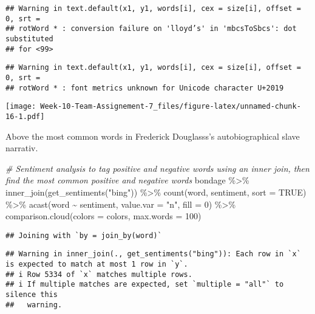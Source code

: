 \documentclass[
]{article}
\newenvironment{Shaded}{\begin{snugshade}}{\end{snugshade}}
\newcommand{\AttributeTok}[1]{\textcolor[rgb]{0.77,0.63,0.00}{#1}}
\newcommand{\CommentTok}[1]{\textcolor[rgb]{0.56,0.35,0.01}{\textit{#1}}}
\newcommand{\ConstantTok}[1]{\textcolor[rgb]{0.00,0.00,0.00}{#1}}
\newcommand{\DecValTok}[1]{\textcolor[rgb]{0.00,0.00,0.81}{#1}}
\newcommand{\FunctionTok}[1]{\textcolor[rgb]{0.00,0.00,0.00}{#1}}
\newcommand{\NormalTok}[1]{#1}
\newcommand{\SpecialCharTok}[1]{\textcolor[rgb]{0.00,0.00,0.00}{#1}}
\newcommand{\StringTok}[1]{\textcolor[rgb]{0.31,0.60,0.02}{#1}}
\begin{document}
\begin{verbatim}
## Warning in text.default(x1, y1, words[i], cex = size[i], offset = 0, srt =
## rotWord * : conversion failure on 'lloyd’s' in 'mbcsToSbcs': dot substituted
## for <99>
\end{verbatim}

\begin{verbatim}
## Warning in text.default(x1, y1, words[i], cex = size[i], offset = 0, srt =
## rotWord * : font metrics unknown for Unicode character U+2019
\end{verbatim}

\texttt{[image: Week-10-Team-Assignement-7\_files/figure-latex/unnamed-chunk-16-1.pdf]}

Above the most common words in Frederick Douglasss's autobiographical
slave narrativ.

\begin{Shaded}
\begin{Highlighting}[]
\CommentTok{\# Sentiment analysis to tag positive and negative words using an inner join, then find the most common positive and negative words}
\NormalTok{bondage }\SpecialCharTok{\%\textgreater{}\%}
  \FunctionTok{inner\_join}\NormalTok{(}\FunctionTok{get\_sentiments}\NormalTok{(}\StringTok{"bing"}\NormalTok{)) }\SpecialCharTok{\%\textgreater{}\%}
  \FunctionTok{count}\NormalTok{(word, sentiment, }\AttributeTok{sort =} \ConstantTok{TRUE}\NormalTok{) }\SpecialCharTok{\%\textgreater{}\%}
  \FunctionTok{acast}\NormalTok{(word }\SpecialCharTok{\textasciitilde{}}\NormalTok{ sentiment, }\AttributeTok{value.var =} \StringTok{"n"}\NormalTok{, }\AttributeTok{fill =} \DecValTok{0}\NormalTok{) }\SpecialCharTok{\%\textgreater{}\%}
  \FunctionTok{comparison.cloud}\NormalTok{(}\AttributeTok{colors =}\NormalTok{ colors,}
                   \AttributeTok{max.words =} \DecValTok{100}\NormalTok{)}
\end{Highlighting}
\end{Shaded}

\begin{verbatim}
## Joining with `by = join_by(word)`
\end{verbatim}

\begin{verbatim}
## Warning in inner_join(., get_sentiments("bing")): Each row in `x` is expected to match at most 1 row in `y`.
## i Row 5334 of `x` matches multiple rows.
## i If multiple matches are expected, set `multiple = "all"` to silence this
##   warning.
\end{verbatim}
\end{document}
